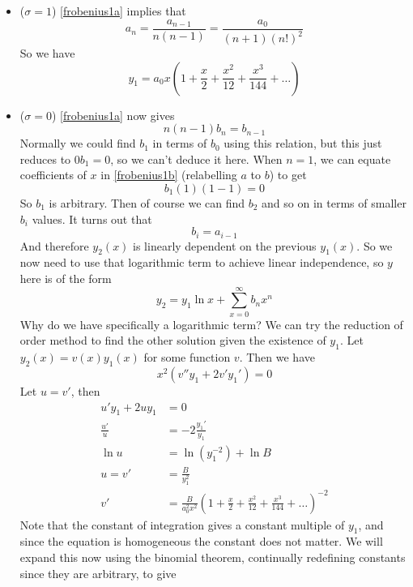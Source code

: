 \begin{itemize}
	\item (\(\sigma = 1\)) \eqref{frobenius1a} implies that
	      \[ a_n = \frac{a_{n-1}}{n(n-1)} = \frac{a_0}{(n+1)(n!)^2} \]
	      So we have
	      \[ y_1 = a_0x\left(1 + \frac{x}{2} + \frac{x^2}{12} + \frac{x^3}{144} + \dots\right) \]
	\item (\(\sigma = 0\)) \eqref{frobenius1a} now gives
	      \[ n(n-1)b_n = b_{n-1} \]
	      Normally we could find \(b_1\) in terms of \(b_0\) using this relation, but this just reduces to \(0b_1 = 0\), so we can't deduce it here. When \(n=1\), we can equate coefficients of \(x\) in \eqref{frobenius1b} (relabelling \(a\) to \(b\)) to get
	      \[ b_1 (1)(1-1) = 0 \]
	      So \(b_1\) is arbitrary. Then of course we can find \(b_2\) and so on in terms of smaller \(b_i\) values. It turns out that
	      \[ b_i = a_{i-1} \]
	      And therefore \(y_2(x)\) is linearly dependent on the previous \(y_1(x)\). So we now need to use that logarithmic term to achieve linear independence, so \(y\) here is of the form
	      \[ y_2 = y_1\ln x + \sum_{x=0}^\infty b_nx^n \]
	      Why do we have specifically a logarithmic term? We can try the reduction of order method to find the other solution given the existence of \(y_1\). Let \(y_2(x) = v(x)y_1(x)\) for some function \(v\). Then we have
	      \[ x^2(v''y_1 + 2v'y_1') = 0 \]
	      Let \(u=v'\), then
	      \begin{align*}
		      u'y_1 + 2uy_1 & = 0                                                                                                  \\
		      \frac{u'}{u}  & = -2\frac{y_1'}{y_1}                                                                                 \\
		      \ln u         & = \ln(y_1^{-2}) + \ln B                                                                              \\
		      u = v'        & = \frac{B}{y_1^2}                                                                                    \\
		      v'            & = \frac{B}{a_0^2 x^2} \left( 1 + \frac{x}{2} + \frac{x^2}{12} + \frac{x^3}{144} + \dots \right)^{-2}
	      \end{align*}
	      Note that the constant of integration gives a constant multiple of \(y_1\), and since the equation is homogeneous the constant does not matter. We will expand this now using the binomial theorem, continually redefining constants since they are arbitrary, to give

\end{itemize}
